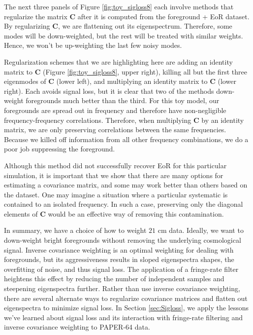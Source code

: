 \documentclass[preprint2,numberedappendix,tighten,twocolappendix]{aastex6}  %
\begin{document}
The next three panels of Figure \ref{fig:toy_sigloss8} each involve methods that regularize the matrix $\textbf{C}$ after it is computed from the foreground + EoR dataset. By regularizing $\textbf{C}$, we are flattening out its eigenspectrum. Therefore, some modes will be down-weighted, but the rest will be treated with similar weights. Hence, we won't be up-weighting the last few noisy modes. 

Regularization schemes that we are highlighting here are adding an identity matrix to $\textbf{C}$ (Figure \ref{fig:toy_sigloss8}, upper right), killing all but the first three eigenmodes of $\textbf{C}$ (lower left), and multiplying an identity matrix to $\textbf{C}$ (lower right). Each avoids signal loss, but it is clear that two of the methods down-weight foregrounds much better than the third. For this toy model, our foregrounds are spread out in frequency and therefore have non-negligible frequency-frequency correlations. Therefore, when multiplying $\textbf{C}$ by an identity matrix, we are only preserving correlations between the same frequencies. Because we killed off information from all other frequency combinations, we do a poor job suppressing the foreground.  

Although this method did not successfully recover EoR for this particular simulation, it is important that we show that there are many options for estimating a covariance matrix, and some may work better than others based on the dataset. One may imagine a situation where a particular systematic is contained to an isolated frequency. In such a case, preserving only the diagonal elements of $\textbf{C}$ would be an effective way of removing this contamination. 

In summary, we have a choice of how to weight $21$ cm data. Ideally, we want to down-weight bright foregrounds without removing the underlying cosmological signal. Inverse covariance weighting is an optimal weighting for dealing with foregrounds, but its aggressiveness results in sloped eigenspectra shapes, the overfitting of noise, and thus signal loss. The application of a fringe-rate filter heightens this effect by reducing the number of independent samples and steepening eigenspectra further. Rather than use inverse covariance weighting, there are several alternate ways to regularize covariance matrices and flatten out eigenspectra to minimize signal loss. In Section \ref{sec:Sigloss}, we apply the lessons we've learned about signal loss and its interaction with fringe-rate filtering and inverse covariance weighting to PAPER-64 data.
\end{document}
